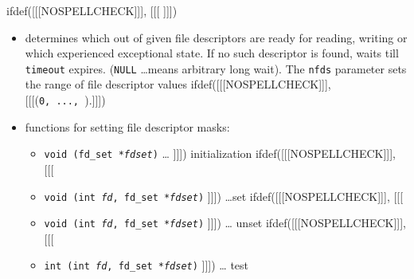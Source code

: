 \begin{slide}
\setlength{\baselineskip}{0.9\baselineskip}
ifdef([[[NOSPELLCHECK]]], [[[
]]])
\begin{itemize}
\item determines which out of given file descriptors are ready for reading,
writing or which experienced exceptional state. If no such descriptor is
found, waits till \texttt{timeout} expires.
(\texttt{NULL} \dots means arbitrary long wait). The \texttt{nfds} parameter
sets the range of file descriptor values
ifdef([[[NOSPELLCHECK]]], [[[(\texttt{0,~...,~}).]]])
\item functions for setting file descriptor masks:
    \begin{itemize}
    ifdef([[[NOSPELLCHECK]]], [[[
    \item \texttt{void (fd\_set *\emph{fdset})} \dots{}
    ]]]) initialization
    ifdef([[[NOSPELLCHECK]]], [[[
    \item \texttt{void (int \emph{fd}, fd\_set *\emph{fdset})}
    ]]]) \dots set
    ifdef([[[NOSPELLCHECK]]], [[[
    \item \texttt{void (int \emph{fd}, fd\_set *\emph{fdset})}
    ]]]) \dots{} unset
    ifdef([[[NOSPELLCHECK]]], [[[
    \item \texttt{int (int \emph{fd}, fd\_set *\emph{fdset})}
    ]]]) \dots{} test
    \end{itemize}
\end{itemize}
\end{slide}


